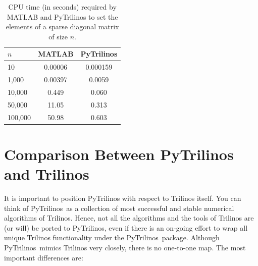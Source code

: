 \documentclass[acmtocl]{acmtrans2m}
\newcommand{\PyTrilinos}{{PyTrilinos}}
\begin{document}
\begin{table}
\begin{center}
\begin{tabular}{| l | c | c |}
\hline
$n$ & MATLAB & PyTrilinos \\
\hline
\hline
10      & 0.00006 & 0.000159 \\
1,000   & 0.00397 & 0.0059 \\
10,000  & 0.449   & 0.060 \\
50,000  & 11.05   & 0.313 \\
100,000 & 50.98   & 0.603 \\
\hline
\end{tabular}
\caption{CPU time (in seconds) required by MATLAB and PyTrilinos to set the
  elements of a  sparse diagonal matrix of size $n$.}
\label{tab:matlab_sparse}
\end{center}
\end{table}

\section{Comparison Between PyTrilinos and Trilinos}
\label{sec:comparison_trilinos}

It is  important to position PyTrilinos with respect to Trilinos
itself. You can think of \PyTrilinos\ as a collection of most
successful and stable numerical algorithms of Trilinos.  Hence, not
all the algorithms and the tools of Trilinos are (or will) be ported
to \PyTrilinos, even if there is an on-going effort to wrap all
unique Trilinos functionality under the \PyTrilinos\ package.
Although \PyTrilinos\ mimics Trilinos very closely, there is no
one-to-one map. The most important differences are:
\end{document}
